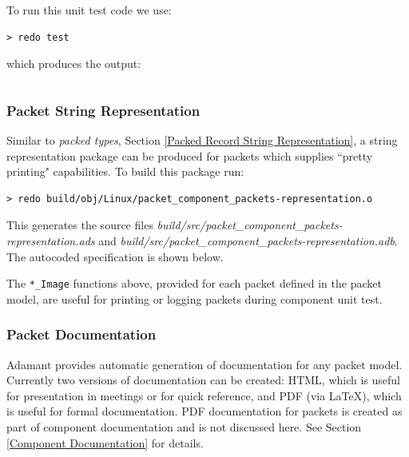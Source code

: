 To run this unit test code we use:

\vspace{5mm} %
\begin{verbatim}
> redo test
\end{verbatim}
\vspace{5mm} %

which produces the output:

\vspace{5mm} %
\inputminted{text}{../example_architecture/packet_component/test/output.txt}
\vspace{5mm} %

\subsubsection{Packet String Representation} \label{Packet String Representation}

Similar to \textit{packed types}, Section \ref{Packed Record String Representation}, a string representation package can be produced for packets which supplies ``pretty printing" capabilities. To build this package run:

\vspace{5mm} %
\begin{verbatim}
> redo build/obj/Linux/packet_component_packets-representation.o
\end{verbatim}
\vspace{5mm} %

This generates the source files \textit{build/src/packet\_component\_packets-representation.ads} and \textit{build/src/packet\_component\_packets-representation.adb}. The autocoded specification is shown below.


The \texttt{*\_Image} functions above, provided for each packet defined in the packet model, are useful for printing or logging packets during component unit test.

\subsubsection{Packet Documentation}

Adamant provides automatic generation of documentation for any packet model. Currently two versions of documentation can be created: HTML, which is useful for presentation in meetings or for quick reference, and PDF (via \LaTeX), which is useful for formal documentation. PDF documentation for packets is created as part of component documentation and is not discussed here. See Section \ref{Component Documentation} for details. \\

